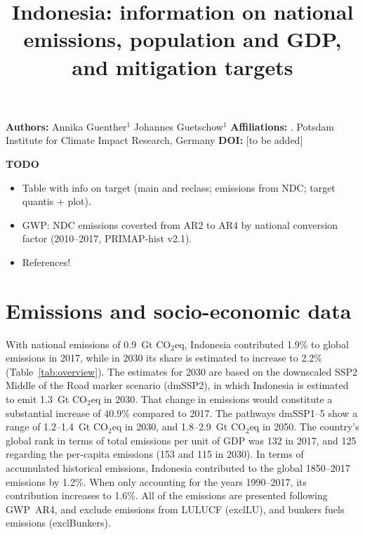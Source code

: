 \documentclass[12pt]{article}
\title{ \bfseries \color{PIKorange} Indonesia: information on national emissions, population and GDP, and mitigation targets}
\begin{document}
 \maketitle

 \noindent \textbf{Authors:} \newline
 \indent Annika Guenther$^{1}$ \newline
 \indent Johannes Guetschow$^{1}$ \newline
 \noindent \textbf{Affiliations:} \newline
 . Potsdam Institute for Climate Impact Research, Germany \newline
 \noindent \textbf{DOI:} [to be added] \newline

 \textbf{TODO}
 \begin{itemize}
 \item Table with info on target (main and reclass; emissions from NDC; target quantis + plot).
 \item GWP: NDC emissions coverted from AR2 to AR4 by national conversion factor (2010--2017, PRIMAP-hist v2.1).
 \item References!
 \end{itemize}

 \newpage %
 \section{Emissions and socio-economic data}
 \label{sec:nonLULUCFSocioEco}
 With national emissions of 0.9~Gt CO$_2$eq, Indonesia contributed 1.9\% to global emissions in 2017, while in 2030 its share is estimated to increase to 2.2\% (Table~\ref{tab:overview}).
 The estimates for 2030 are based on the downscaled SSP2 Middle of the Road marker scenario (dmSSP2), in which Indonesia is estimated to emit 1.3~Gt CO$_2$eq in 2030.
 That change in emissions would constitute a substantial increase of 40.9\% compared to 2017. 
 The pathways dmSSP1--5 show a range of 1.2--1.4~Gt CO$_2$eq in 2030, and 1.8--2.9~Gt CO$_2$eq in 2050.
 The country's global rank in terms of total emissions per unit of GDP was 132 in 2017, and 125 regarding the per-capita emissions (153 and 115 in 2030).
 In terms of accumulated historical emissions, Indonesia contributed to the global 1850--2017 emissions by 1.2\%. 
 When only accounting for the years 1990--2017, its contribution increases to 1.6\%.
 All of the emissions are presented following GWP~AR4, and exclude emissions from LULUCF (exclLU), and bunkers fuels emissions (exclBunkers).
\end{document}
